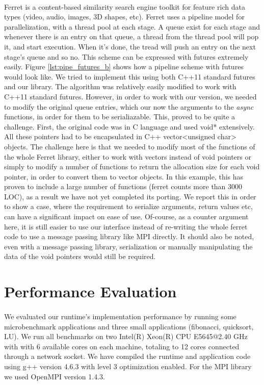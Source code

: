 \paragraph{}
Ferret is a content-based similarity search engine toolkit for feature rich
data types (video, audio, images, 3D shapes, etc).
Ferret uses a pipeline model for parallelization, 
with a thread pool at each stage.  A queue exist for each stage and whenever
there is an entry on that queue, a thread from the thread pool will pop it, and start execution.  When it's
done, the tread will push an entry on the next stage's queue and so no.  This scheme can be expressed with
futures extremely easily.  Figure \ref{lst:pipe_futures_b} shows how a pipeline scheme with futures would 
look like.  We tried to implement this using both C++11 standard futures and our library.  The algorithm
was relatively easily modified to work with C++11 standard futures.  However, in order to work with our
version, we needed to modify the original queue entries, which our now the arguments to the \emph{async}
functions, in order for them to be serialiazable.  This, proved to be quite a challenge.  First, the original
code was in C language and used void* extensively.  All these pointers had to be encapsulated in 
C++ vector<unsigned char> objects.  The challenge here is that we needed to modify most of the functions
of the whole Ferret library, either to work with vectors instead of void pointers or simply to modify a 
number of functions to return the allocation size for each void pointer, in order to convert 
them to vector objects.  In this example, this has proven to include a large number of functions (ferret
counts more than 3000 LOC), as a result we have not yet completed its porting.  We report this in order
to show a case, where the requirement to serialize arguments, return values etc, can have a significant
impact on ease of use.  Of-course, as a counter argument here, it is still easier to 
use our interface instead of re-writing the whole ferret code to use a message passing library like MPI
directly.  It should also be noted, even with a message passing library, serialization or manually
manipulating the data of the void pointers would still be required.  

  
\section{Performance Evaluation}
\label{sect:eval_intro}
\paragraph{}
	We evaluated our runtime's implementation performance by running some microbenchmark applications and
three small applications (fibonacci, quicksort, LU).  We run all benchmarks on two Intel(R) Xeon(R) 
CPU E5645@2.40 GHz with with 6 available cores on each machine, totaling to 12 cores connected through 
a network socket. We have compiled the runtime and application code using g++ version 4.6.3 with 
level 3 optimization enabled.  For the MPI library we used OpenMPI version 1.4.3.

